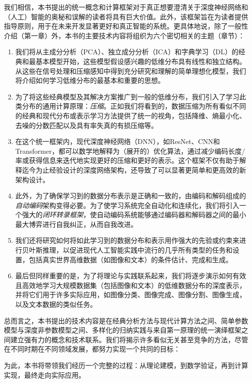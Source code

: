 \documentclass[../../book-main_zh.tex]{subfiles}
\begin{document}
我们相信，本书提出的统一概念和计算框架对于真正想要澄清关于深度神经网络和（人工）智能的奥秘和误解的读者将具有巨大价值。此外，该框架旨在为读者提供指导原则，用于在未来开发显著更好和真正智能的系统。更具体地说，除了一般性介绍（第一章）外，本书的主要技术内容将组织为六个密切相关的主题（章节）：
\begin{enumerate}
\item 我们将从主成分分析（PCA）、独立成分分析（ICA）和字典学习（DL）的经典和最基本模型开始，这些模型假设感兴趣的低维分布具有线性和独立结构。从这些在信号处理和压缩感知中得到充分研究和理解的简单理想化模型，我们将介绍如何学习低维分布的最基本和重要的思想。

\item 为了将这些经典模型及其解决方案推广到一般的低维分布，我们引入了学习此类分布的通用计算原理：{\em 压缩}。正如我们将看到的，数据压缩为所有看似不同的经典和现代分布或表示学习方法提供了统一的视角，包括降维、熵最小化、去噪的分数匹配以及具有率失真的有损压缩等。

\item 在这个统一框架内，现代深度神经网络（DNN），如ResNet、CNN和Transformer，都可以数学地解释为（展开的）优化算法，通过减少编码长度/率或获得信息来迭代地实现更好的压缩和更好的表示。这个框架不仅有助于解释迄今为止经验设计的深度网络架构，还导致了可以显著更简单和更高效的新架构设计。

\item 此外，为了确保学习到的数据分布表示是正确和一致的，由编码和解码组成的{\em 自动编码}架构变得必要。为了使学习系统完全自动化和连续化，我们将引入一个强大的{\em 闭环转录框架}，使自动编码系统能够通过编码器和解码器之间的最小最大博弈进行自我纠正，从而自我改进。

\item 我们还将研究如何将如此学习到的数据分布和表示用作强大的先验或约束来进行贝叶斯推理，以促进现代人工智能实践中流行的几乎所有类型的任务和设置，包括真实世界高维数据（如图像和文本）的条件估计、完成和生成。

\item 最后但同样重要的是，为了将理论与实践联系起来，我们将逐步演示如何有效且高效地学习大规模数据集（包括图像和文本）的低维数据分布的深度表示，并将它们用于许多实际应用，如图像分类、图像完成、图像分割、图像生成，以及文本数据的类似任务。
\end{enumerate}

总而言之，本书提出的技术内容是在经典分析方法与现代计算方法之间、简单参数模型与深度非参数模型之间、多样化的归纳实践与来自第一原理的统一演绎框架之间建立强有力的概念和技术联系。我们将揭示许多看似无关甚至竞争的方法，尽管在不同时期在不同领域发展，都努力实现一个共同的目标：
\begin{quote}
\end{quote}
为此，本书将带领我们经历一个完整的过程：从理论建模，到数学验证，再到计算实现，最终走向实际应用。
\end{document}
